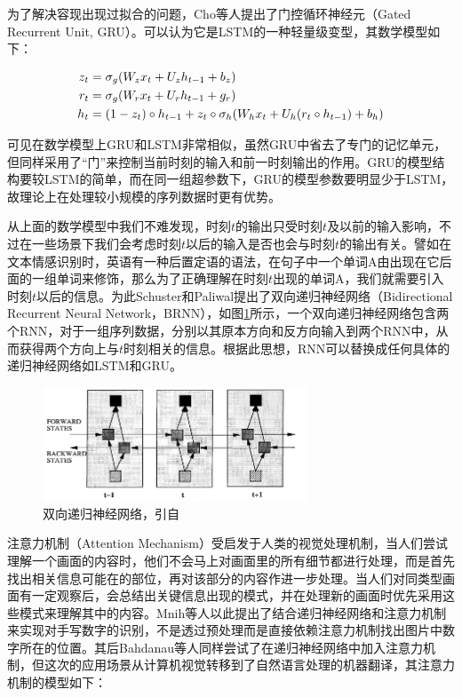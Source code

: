 为了解决容现出现过拟合的问题，Cho等人\cite{cho2014learning}提出了门控循环神经元（Gated Recurrent Unit, GRU）。可以认为它是LSTM的一种轻量级变型，其数学模型如下：

\vspace{-10mm}
\begin{equation}
\vspace{-2.5mm}
\begin{aligned}
  \label{eq:gru}
  z_t &= \sigma_g (W_z x_t + U_z h_{t-1} + b_z) \\
  r_t &= \sigma_g (W_r x_t + U_r h_{t-1} + g_r) \\
  h_t &= (1 - z_t) \circ h_{t-1} + z_t \circ \sigma_h (W_h x_t + U_h (r_t \circ h_{t-1}) + b_h) 
\end{aligned}
\end{equation}

可见在数学模型上GRU和LSTM非常相似，虽然GRU中省去了专门的记忆单元，但同样采用了“门”来控制当前时刻的输入和前一时刻输出的作用。GRU的模型结构要较LSTM的简单，而在同一组超参数下，GRU的模型参数要明显少于LSTM，故理论上在处理较小规模的序列数据时更有优势。

从上面的数学模型中我们不难发现，时刻$t$的输出只受时刻$t$及以前的输入影响，不过在一些场景下我们会考虑时刻$t$以后的输入是否也会与时刻$t$的输出有关。譬如在文本情感识别时，英语有一种后置定语的语法，在句子中一个单词A由出现在它后面的一组单词来修饰，那么为了正确理解在时刻$t$出现的单词A，我们就需要引入时刻$t$以后的信息。为此Schuster和Paliwal\cite{schuster1997bidirectional}提出了双向递归神经网络（Bidirectional Recurrent Neural Network，BRNN），如图\ref{fig:brnn}所示，一个双向递归神经网络包含两个RNN，对于一组序列数据，分别以其原本方向和反方向输入到两个RNN中，从而获得两个方向上与$t$时刻相关的信息。根据此思想，RNN可以替换成任何具体的递归神经网络如LSTM和GRU。

\begin{figure}[H]
  \centering
  \includegraphics[width=0.7\textwidth]{img/brnn.png}
  \caption{双向递归神经网络，引自\cite{schuster1997bidirectional}}
  \label{fig:brnn}
\end{figure}

注意力机制（Attention Mechanism）受启发于人类的视觉处理机制，当人们尝试理解一个画面的内容时，他们不会马上对画面里的所有细节都进行处理，而是首先找出相关信息可能在的部位，再对该部分的内容作进一步处理。当人们对同类型画面有一定观察后，会总结出关键信息出现的模式，并在处理新的画面时优先采用这些模式来理解其中的内容。Mnih等人\cite{mnih2014recurrent}以此提出了结合递归神经网络和注意力机制来实现对手写数字的识别，不是透过预处理而是直接依赖注意力机制找出图片中数字所在的位置。其后Bahdanau等人\cite{bahdanau2014neural}同样尝试了在递归神经网络中加入注意力机制，但这次的应用场景从计算机视觉转移到了自然语言处理的机器翻译，其注意力机制的模型如下：

